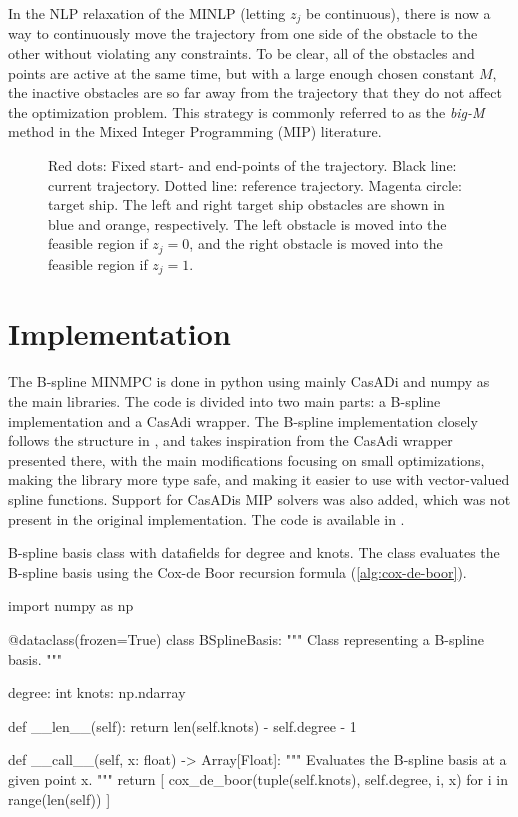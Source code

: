 In the NLP relaxation of the MINLP (letting $z_j$ be continuous), there is now a way to continuously move the trajectory from one side of the obstacle to the other without violating any constraints. To be clear, all of the obstacles and points are active at the same time, but with a large enough chosen constant $M$, the inactive obstacles are so far away from the trajectory that they do not affect the optimization problem. This strategy is commonly referred to as the \emph{big-M} method in the Mixed Integer Programming (MIP) literature.

\begin{figure}
    \centering
    
    \caption{Red dots: Fixed start- and end-points of the trajectory. Black line: current trajectory. Dotted line: reference trajectory. Magenta circle: target ship. The left and right target ship obstacles are shown in blue and orange, respectively. The left obstacle is moved into the feasible region if $z_j = 0$, and the right obstacle is moved into the feasible region if $z_j = 1$.}
    \label{fig:non-convex-obstacle-mi}
\end{figure}

\section{Implementation}

The B-spline MINMPC is done in python using mainly CasADi \citep{casadi} and numpy \citep{numpy} as the main libraries. The code is divided into two main parts: a B-spline implementation and a CasAdi wrapper. 
The B-spline implementation closely follows the structure in \citet{mercy2016spline}, and takes inspiration from the CasAdi wrapper presented there, with the main modifications focusing on small optimizations, making the library more type safe, and making it easier to use with vector-valued spline functions. Support for CasADis MIP solvers was also added, which was not present in the original implementation. 
The code is available in .

\begin{algorithm}
\caption{B-spline basis class with datafields for degree and knots. The class evaluates the B-spline basis using the Cox-de Boor recursion formula (\cref{alg:cox-de-boor}).}
\label{alg:b-spline-class}
\begin{python}
import numpy as np

@dataclass(frozen=True)
class BSplineBasis:
    """
    Class representing a B-spline basis.
    """

    degree: int
    knots: np.ndarray

    def __len__(self):
        return len(self.knots) - self.degree - 1

    def __call__(self, x: float) -> Array[Float]:
        """
        Evaluates the B-spline basis at a given point x.
        """
        return [
            cox_de_boor(tuple(self.knots), self.degree, i, x)
            for i in range(len(self))
        ]

\end{python}
\end{algorithm}

